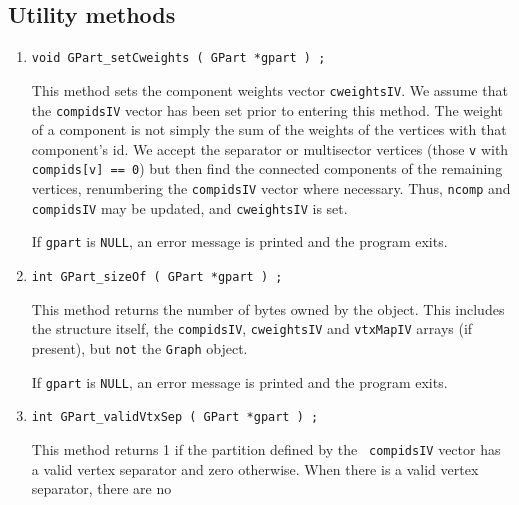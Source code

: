 \subsection{Utility methods}
\label{subsection:GPart:proto:utilities}
\par
\begin{enumerate}
\item
\begin{verbatim}
void GPart_setCweights ( GPart *gpart ) ;
\end{verbatim}
This method sets the component weights vector {\tt cweightsIV}.
We assume that the {\tt compidsIV} vector has been set prior to
entering this method.
The weight of a component is not simply the sum of the weights of
the vertices with that component's id.
We accept the separator or multisector vertices (those {\tt v} with
{\tt compids[v] == 0}) but then find the connected components of
the remaining vertices, renumbering the {\tt compidsIV} vector
where necessary.
Thus, {\tt ncomp} and {\tt compidsIV} may be updated, 
and {\tt cweightsIV} is set.
\par {}
If {\tt gpart} is {\tt NULL},
an error message is printed and the program exits.
\item
\begin{verbatim}
int GPart_sizeOf ( GPart *gpart ) ;
\end{verbatim}
This method returns the number of bytes owned by the object.
This includes the structure itself, the {\tt compidsIV},
{\tt cweightsIV} and {\tt vtxMapIV} arrays (if present),
but {\tt not} the {\tt Graph} object.
\par {}
If {\tt gpart} is {\tt NULL},
an error message is printed and the program exits.
\item
\begin{verbatim}
int GPart_validVtxSep ( GPart *gpart ) ;
\end{verbatim}
This method returns 1 if the partition defined by the {\tt
compidsIV} vector has a valid vertex separator and zero otherwise.
When there is a valid vertex separator, there are no

\end{enumerate}
